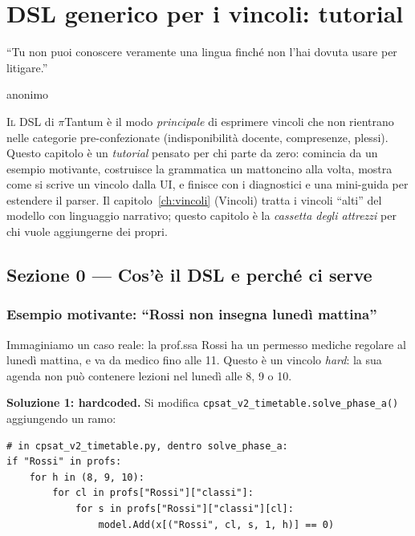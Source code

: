 \chapter{DSL generico per i vincoli: tutorial}
\label{ch:dsl}
\label{ch:dsl_generico_per_i_vincoli}

\epigraph{``Tu non puoi conoscere veramente una lingua finch\'e
non l'hai dovuta usare per litigare.''}{anonimo}

\lettrine[lines=3]{I}{l} DSL di $\pi$Tantum \`e il modo
\emph{principale} di esprimere vincoli che non rientrano nelle
categorie pre-confezionate (indisponibilit\`a docente,
compresenze, plessi). Questo capitolo \`e un \emph{tutorial}
pensato per chi parte da zero: comincia da un esempio motivante,
costruisce la grammatica un mattoncino alla volta, mostra come
si scrive un vincolo dalla UI, e finisce con i diagnostici e
una mini-guida per estendere il parser. Il
capitolo~\ref{ch:vincoli} (Vincoli) tratta i vincoli ``alti''
del modello con linguaggio narrativo; questo capitolo \`e la
\emph{cassetta degli attrezzi} per chi vuole aggiungerne dei
propri.

\section{Sezione 0 --- Cos'\`e il DSL e perch\'e ci serve}
\label{sec:dsl-motivazione}

\subsection*{Esempio motivante: ``Rossi non insegna luned\`i mattina''}

Immaginiamo un caso reale: la prof.ssa Rossi ha un permesso
mediche regolare al luned\`i mattina, e va da medico fino alle
11. Questo \`e un vincolo \emph{hard}: la sua agenda non pu\`o
contenere lezioni nel luned\`i alle 8, 9 o 10.

\textbf{Soluzione 1: hardcoded.} Si modifica
\texttt{cpsat\_v2\_timetable.solve\_phase\_a()} aggiungendo un
ramo:

\begin{lstlisting}[style=py,basicstyle=\ttfamily\small]
# in cpsat_v2_timetable.py, dentro solve_phase_a:
if "Rossi" in profs:
    for h in (8, 9, 10):
        for cl in profs["Rossi"]["classi"]:
            for s in profs["Rossi"]["classi"][cl]:
                model.Add(x[("Rossi", cl, s, 1, h)] == 0)
\end{lstlisting}

